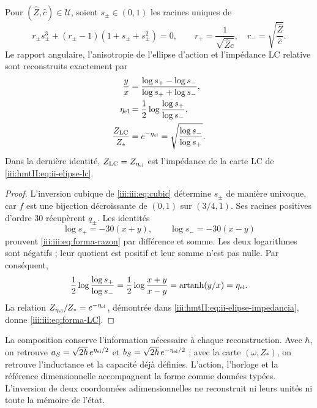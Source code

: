 \begin{proposition}
\label{iii:iii:prop:forma-LC}
Pour $(\widehat Z,\widehat c)\in\mathcal U$, soient $s_\pm\in(0,1)$ les
racines uniques de
\begin{equation}
 r_\pm s_\pm^3+(r_\pm-1)(1+s_\pm+s_\pm^2)=0,
 \qquad
 r_+=\frac1{\sqrt{\widehat Z\widehat c}},\quad
 r_-=\sqrt{\frac{\widehat Z}{\widehat c}}.
 \label{iii:iii:eq:forma-inversion}
\end{equation}
Le rapport angulaire, l’anisotropie de l’ellipse d’action et l’impédance
LC relative sont reconstruits exactement par
\begin{align}
 \frac{y}{x}
 &=\frac{\log s_+-\log s_-}{\log s_++\log s_-},
 \label{iii:iii:eq:forma-razon}\\
 \eta_{\rm el}
 &=\frac12\log\frac{\log s_+}{\log s_-},
 \label{iii:iii:eq:forma-eta}\\
 \frac{Z_{\rm LC}}{Z_*}
 &=e^{-\eta_{\rm el}}
  =\sqrt{\frac{\log s_-}{\log s_+}}.
 \label{iii:iii:eq:forma-LC}
\end{align}
Dans la dernière identité, $Z_{\rm LC}=Z_{\eta_{\rm el}}$ est l’impédance
de la carte LC de \eqref{iii:hmtII:eq:ii-elipse-lc}.
\end{proposition}
\begin{proof}
L'inversion cubique de \eqref{iii:iii:eq:cubic} détermine $s_\pm$ de manière univoque, car $f$ est une bijection décroissante de $(0,1)$ sur $(3/4,1)$. Ses racines positives d'ordre $30$ récupèrent $q_\pm$. Les identités
\[
 \log s_+=-30(x+y),\qquad \log s_-=-30(x-y)
\]
prouvent \eqref{iii:iii:eq:forma-razon} par différence et somme. Les deux logarithmes
sont négatifs ; leur quotient est positif et leur somme n’est pas nulle. Par conséquent,
\[
 \frac12\log\frac{\log s_+}{\log s_-}
   =\frac12\log\frac{x+y}{x-y}
   =\operatorname{artanh}(y/x)=\eta_{\rm el}.
\]
La relation $Z_{\eta_{\rm el}}/Z_*=e^{-\eta_{\rm el}}$, démontrée dans
\eqref{iii:hmtII:eq:ii-elipse-impedancia}, donne \eqref{iii:iii:eq:forma-LC}.
\end{proof}

La composition conserve l’information nécessaire à chaque reconstruction.
Avec $\hbar$, on retrouve
$a_S=\sqrt{2\hbar}\,e^{\eta_{\rm el}/2}$ et
$b_S=\sqrt{2\hbar}\,e^{-\eta_{\rm el}/2}$ ; avec la carte
$(\omega,Z_*)$, on retrouve l’inductance et la capacité déjà définies.
L’action, l’horloge et la référence dimensionnelle accompagnent la forme comme
données typées. L’inversion de deux coordonnées adimensionnelles ne
reconstruit ni leurs unités ni toute la mémoire de l’état.

